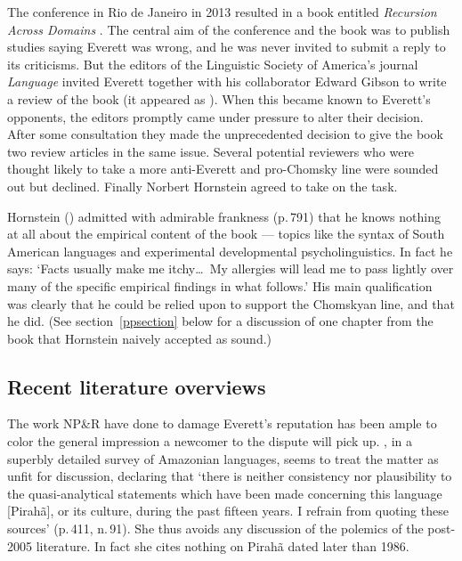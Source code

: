 \documentclass[output=paper,colorlinks,citecolor=brown
]{langscibook}
\begin{document}
The conference in Rio de Janeiro in 2013 resulted in a book entitled
\textit{Recursion Across Domains} \citep{AmMaNeRo18}. The central aim
of the conference and the book was to publish studies saying Everett
was wrong, and he was never invited to submit a reply to its
criticisms. But the editors of the Linguistic Society of America's
journal \textit{Language} invited Everett together with his
collaborator Edward Gibson to write a review of the book (it appeared
as \citealt{EverGibs19}). When this became known to Everett's
opponents, the editors promptly came under pressure to alter their
decision. After some consultation they made the unprecedented decision
to give the book two review articles in the same issue. Several
potential reviewers who were thought likely to take a more anti-Everett
and pro-Chomsky line were sounded out but declined. Finally Norbert
Hornstein agreed to take on the task.

Hornstein (\citeyear{Hornstein19}) admitted with admirable frankness
(p.\,791) that he knows nothing at all about the empirical content
of the book --- topics like the syntax of South American languages
and experimental developmental psycholinguistics. In fact he says:
`Facts usually make me itchy\ldots\ My allergies will lead me to pass
lightly over many of the specific empirical findings in what follows.'
His main qualification was clearly that he could be relied upon to
support the Chomskyan line, and that he did. (See section~\ref{ppsection}
below for a discussion of one chapter from the book that Hornstein
naively accepted as sound.)

\subsection{Recent literature overviews}

The work NP\&R have done to damage Everett's reputation has been ample
to color the general impression a newcomer to the dispute will pick up.
\citet{Aikhenvald12}, in a superbly detailed survey of Amazonian
languages, seems to treat the matter as unfit for discussion,
declaring that `there is neither consistency nor plausibility to the
quasi-analytical statements which have been made concerning this
language [Pirah{\~a}], or its culture, during the past fifteen years.
I refrain from quoting these sources' (p.\,411, n.\,91). She thus
avoids any discussion of the polemics of the post-2005 literature.
In fact she cites nothing on Pirah{\~a} dated later than 1986.
\end{document}
